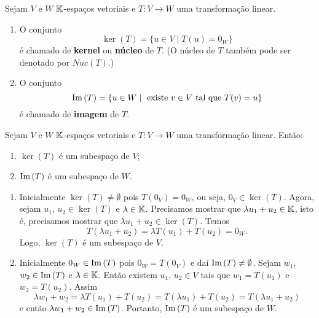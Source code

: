 \begin{definicao}
  Sejam $V$ e $W$ $\mathbb{K}$-espaços vetoriais e $T \colon V \to W$ uma transformação linear.
  \begin{enumerate}[label={\roman*})]
    \item O conjunto
    \[
      \ker(T) = \{u \in V \mid T(u) = 0_W\}
    \]
    é chamado de \textbf{kernel} ou \textbf{núcleo} de $T$. (O núcleo de $T$ também pode ser denotado por $Nuc(T)$.)

    \item O conjunto
    \[
      {\rm Im\,}(T) = \{u \in W \mid \mbox{ existe } v \in V \mbox{ tal que } T(v) = u\}
    \]
    é chamado de \textbf{imagem} de $T$.
  \end{enumerate}
\end{definicao}

\begin{proposicao}
  Sejam $V$ e $W$ $\mathbb{K}$-espaços vetoriais e $T \colon V \to W$ uma transformação linear. Então:
  \begin{enumerate}[label={\roman*})]
    \item $\ker(T)$ é um subespaço de $V$;
    \item ${\rm Im\,}(T)$ é um subespaço de $W$.
  \end{enumerate}
\end{proposicao}
\begin{prova}
  \begin{enumerate}[label={\roman*})]
    \item Inicialmente $\ker(T) \ne \emptyset$ pois $T(0_V) = 0_W$, ou seja, $0_V \in \ker(T)$. Agora, sejam $u_1$, $u_2 \in \ker(T)$ e $\lambda \in \mathbb{K}$. Precisamos mostrar que $\lambda u_1 + u_2 \in \mathbb{K}$, isto é, precisamos mostrar que $\lambda u_1 + u_2 \in \ker(T)$. Temos
    \[
      T(\lambda u_1 + u_2) = \lambda T(u_1) + T(u_2) = 0_W.
    \]
    Logo, $\ker(T)$ é um subespaço de $V$.

    \item Inicialmente $0_W \in {\rm Im\,}(T)$ pois $0_W = T(0_V)$ e daí ${\rm Im\,}(T) \ne \emptyset$. Sejam $w_1$, $w_2 \in {\rm Im\,}(T)$ e $\lambda \in \mathbb{K}$. Então existem $u_1$, $u_2 \in V$ tais que $w_1 = T(u_1)$ e $w_2 = T(u_2)$. Assim
    \[
      \lambda w_1 + w_2 = \lambda T(u_1) + T(u_2) = T(\lambda u_1) + T(u_2) = T(\lambda u_1 + u_2)
    \]
    e então $\lambda w_1 + w_2 \in {\rm Im\,}(T)$. Portanto, ${\rm Im\,}(T)$ é um subespaço de $W$.
  \end{enumerate}
\end{prova}

